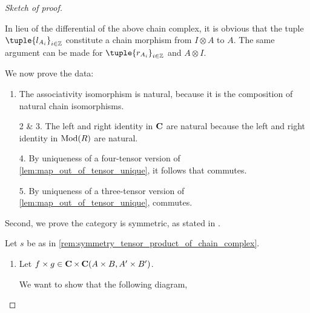 \begin{proof}[Sketch of proof]
\begin{enumerate}
{            In lieu of the differential of the above chain complex, it is obvious that the tuple \( \tuple{l_{A_i}}_{i \in \Zb} \) constitute a chain morphism from \( I \otimes A \) to \( A \). The same argument can be made for \( \tuple{r_{A_i}}_{i \in \Zb} \) and \( A \otimes I \).
        }
    \end{enumerate}
    We now prove the data:
    \begin{enumerate}
        \item {
            The associativity isomorphism is natural, because it is the composition of natural chain isomorphisms. 
        }
        \item[2 \& 3.] {
            The left and right identity in \( \operatorname{\mathbf{C}} \) are natural because the left and right identity in \( \operatorname{Mod}(R) \) are natural.
        }
        \item[4.] {
            By uniqueness of a four-tensor version of \autoref{lem:map_out_of_tensor_unique}, it follows that \cite[Diagram 6.1]{Borceux_1994} commutes.
        }
        \item[5.] {
            By uniqueness of a three-tensor version of \autoref{lem:map_out_of_tensor_unique}, \cite[Diagram 6.2]{Borceux_1994} commutes.
        }
    \end{enumerate}

    Second, we prove the category is symmetric, as stated in \cite[Definition 6.1.2]{Borceux_1994}.

    Let \( s \) be as in \autoref{rem:symmetry_tensor_product_of_chain_complex}.

    \begin{enumerate}
        \item {
            Let \( f \times g \in \operatorname{\mathbf{C}} \times \operatorname{\mathbf{C}} (A \times B, A' \times B') \).

            We want to show that the following diagram,
            \begin{center}
\end{center}}
\end{enumerate}
\end{proof}
